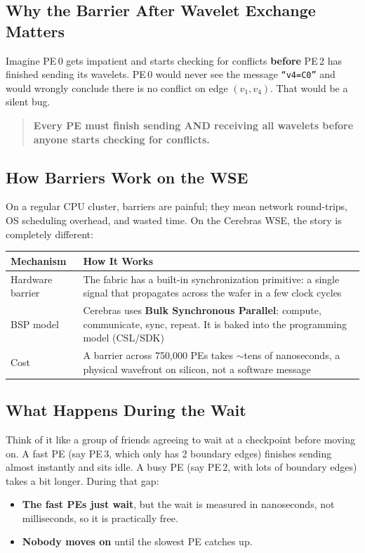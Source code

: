 \documentclass[11pt,letterpaper]{article}
\begin{document}
\subsection{Why the Barrier After Wavelet Exchange Matters}

Imagine PE\,0 gets impatient and starts checking for conflicts \textbf{before} PE\,2 has finished sending its wavelets. PE\,0 would never see the message \texttt{``v4=C0''} and would wrongly conclude there is no conflict on edge $(v_1, v_4)$. That would be a silent bug.

\begin{quote}
\textbf{Every PE must finish sending AND receiving all wavelets before anyone starts checking for conflicts.}
\end{quote}

\subsection{How Barriers Work on the WSE}

On a regular CPU cluster, barriers are painful; they mean network round-trips, OS scheduling overhead, and wasted time. On the Cerebras WSE, the story is completely different:

\begin{center}
\renewcommand{\arraystretch}{1.3}
\begin{tabular}{>{\raggedright}p{3.2cm} p{9.5cm}}
\toprule
\textbf{Mechanism} & \textbf{How It Works} \\
\midrule
Hardware barrier & The fabric has a built-in synchronization primitive: a single signal that propagates across the wafer in a few clock cycles \\
BSP model & Cerebras uses \textbf{Bulk Synchronous Parallel}: compute, communicate, sync, repeat. It is baked into the programming model (CSL/SDK) \\
Cost & A barrier across 750,000 PEs takes ${\sim}$tens of nanoseconds, a physical wavefront on silicon, not a software message \\
\bottomrule
\end{tabular}
\end{center}

\subsection{What Happens During the Wait}

Think of it like a group of friends agreeing to wait at a checkpoint before moving on. A fast PE (say PE\,3, which only has 2 boundary edges) finishes sending almost instantly and sits idle. A busy PE (say PE\,2, with lots of boundary edges) takes a bit longer. During that gap:
\begin{itemize}[nosep]
  \item \textbf{The fast PEs just wait}, but the wait is measured in nanoseconds, not milliseconds, so it is practically free.
  \item \textbf{Nobody moves on} until the slowest PE catches up.
\end{itemize}
\end{document}
